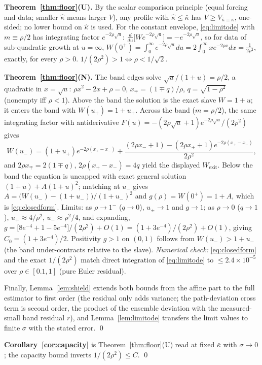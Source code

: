 \documentclass[11pt]{article}
\theoremstyle{remark}
\newcommand{\kb}{\bar\kappa}
\begin{document}
\textbf{Theorem~\ref{thm:floor}(U).} By the scalar comparison principle
(equal forcing and data; smaller $\hat\kappa$ means larger $V$), any profile with
$\hat\kappa\le\kb$ has $V\ge V_{\hat\kappa\equiv\kb}$, one-sided; no lower bound on
$\hat\kappa$ is used. For the constant envelope, \eqref{eq:limitode} with
$m\equiv\rho/2$ has integrating factor $e^{-2\rho\sqrt u}$:
$\frac{d}{du}\big[We^{-2\rho\sqrt u}\big]=-e^{-2\rho\sqrt u}$, so for data of
sub-quadratic growth at $u=\infty$,
$W(0^+)=\int_0^\infty e^{-2\rho\sqrt u}du=2\int_0^\infty xe^{-2\rho x}dx=\frac1{2\rho^2}$,
exactly, for every $\rho>0$. $1/(2\rho^2)>1\iff\rho<1/\sqrt2$.

\textbf{Theorem~\ref{thm:floor}(N).} The band edges solve $\sqrt u/(1+u)=\rho/2$, a
quadratic in $x=\sqrt u$: $\rho x^2-2x+\rho=0$, $x_\mp=(1\mp q)/\rho$, $q=\sqrt{1-\rho^2}$
(nonempty iff $\rho<1$). Above the band the solution is the exact slave $W=1+u$; it
enters the band with $W(u_+)=1+u_+$. Across the band ($m=\rho/2$), the same integrating
factor with antiderivative $F(u)=-(2\rho\sqrt u+1)e^{-2\rho\sqrt u}/(2\rho^2)$ gives
\[
W(u_-)=(1+u_+)e^{-2\rho(x_+-x_-)}
+\frac{(2\rho x_-+1)-(2\rho x_++1)e^{-2\rho(x_+-x_-)}}{2\rho^2},
\]
and $2\rho x_\mp=2(1\mp q)$, $2\rho(x_+-x_-)=4q$ yield the displayed $W_{\mathrm{exit}}$.
Below the band the equation is uncapped with exact general solution $(1+u)+A(1+u)^2$;
matching at $u_-$ gives $A=\big(W(u_-)-(1+u_-)\big)/(1+u_-)^2$ and
$g(\rho)=W(0^+)=1+A$, which is \eqref{eq:closedform}. Limits: as $\rho\to1^-$ ($q\to0$),
$u_\pm\to1$ and $g\to1$; as $\rho\to0$ ($q\to1$), $u_+\approx4/\rho^2$,
$u_-\approx\rho^2/4$, and expanding,
$g=\big[8e^{-4}+1-5e^{-4}\big]/(2\rho^2)+O(1)=(1+3e^{-4})/(2\rho^2)+O(1)$, giving
$C_0=(1+3e^{-4})/2$. Positivity $g>1$ on $(0,1)$ follows from $W(u_-)>1+u_-$ (the band
under-contracts relative to the slave). \emph{Numerical check:} \eqref{eq:closedform}
and the exact $1/(2\rho^2)$ match direct integration of \eqref{eq:limitode} to
$\le2.4\times10^{-5}$ over $\rho\in[0.1,1]$ (pure Euler residual).

Finally, Lemma~\ref{lem:shield} extends both bounds from the affine part to the full
estimator to first order (the residual only adds variance; the path-deviation cross
term is second order, the product of the ensemble deviation with the measured-small
band residual $r$), and Lemma~\ref{lem:limitode} transfers the
limit values to finite $\sigma$ with the stated error. \qed

\textbf{Corollary~\ref{cor:capacity}} is Theorem~\ref{thm:floor}(U) read at fixed
$\kb$ with $\sigma\to0$; the capacity bound inverts $1/(2\rho^2)\le C$. \qed
\end{document}
